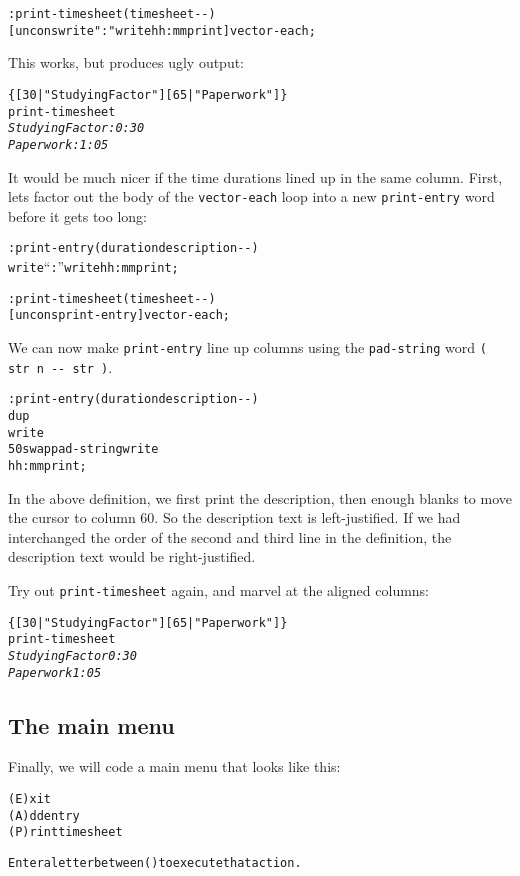 \documentclass[english]{article}
\begin{document}
\begin{alltt}
: print-timesheet ( timesheet -{}- )
    {[} uncons write ": " write hh:mm print {]} vector-each ;
\end{alltt}
This works, but produces ugly output:

\begin{alltt}
\{ {[} 30 | "Studying Factor" {]} {[} 65 | "Paperwork" {]} \}
print-timesheet
\emph{Studying Factor: 0:30}
\emph{Paperwork: 1:05}
\end{alltt}
It would be much nicer if the time durations lined up in the same
column. First, lets factor out the body of the \texttt{vector-each}
loop into a new \texttt{print-entry} word before it gets too long:

\begin{alltt}
: print-entry ( duration description -{}- )
    write {}``: '' write hh:mm print ;

: print-timesheet ( timesheet -{}- )
    {[} uncons print-entry {]} vector-each ;
\end{alltt}
We can now make \texttt{print-entry} line up columns using the \texttt{pad-string}
word \texttt{( str n -{}- str )}.

\begin{alltt}
: print-entry ( duration description -{}- )
    dup
    write
    50 swap pad-string write 
    hh:mm print ;
\end{alltt}
In the above definition, we first print the description, then enough
blanks to move the cursor to column 60. So the description text is
left-justified. If we had interchanged the order of the second and
third line in the definition, the description text would be right-justified.

Try out \texttt{print-timesheet} again, and marvel at the aligned
columns:

\begin{alltt}
\{ {[} 30 | "Studying Factor" {]} {[} 65 | "Paperwork" {]} \}
print-timesheet
\emph{Studying Factor                                   0:30}
\emph{Paperwork                                         1:05}
\end{alltt}

\subsection{The main menu}

Finally, we will code a main menu that looks like this:

\begin{alltt}

(E)xit
(A)dd entry
(P)rint timesheet

Enter a letter between ( ) to execute that action.
\end{alltt}
\end{document}
